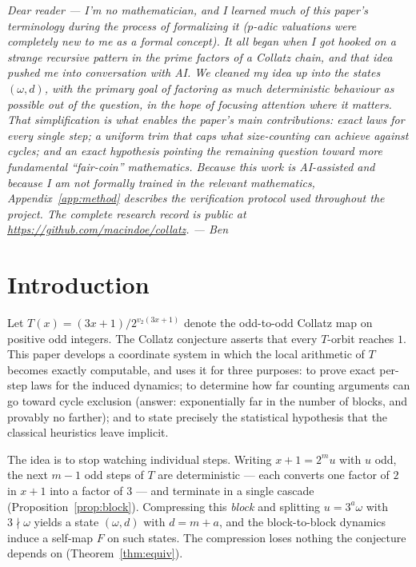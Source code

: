 \documentclass[11pt]{article}
\theoremstyle{remark}
\newcommand{\vt}[1]{v_2\!\left(#1\right)}
\newcommand{\w}{\omega}
\begin{document}
\emph{Dear reader --- I'm no mathematician, and I learned much of this paper's terminology during the process of formalizing it ($p$-adic valuations were completely new to me as a formal concept). It all began when I got hooked on a strange recursive pattern in the prime factors of a Collatz chain, and that idea pushed me into conversation with AI. We cleaned my idea up into the states $(\w,d)$, with the primary goal of factoring as much deterministic behaviour as possible out of the question, in the hope of focusing attention where it matters. That simplification is what enables the paper's main contributions: exact laws for every single step; a uniform trim that caps what size-counting can achieve against cycles; and an exact hypothesis pointing the remaining question toward more fundamental ``fair-coin'' mathematics. Because this work is AI-assisted and because I am not formally trained in the relevant mathematics, Appendix~\ref{app:method} describes the verification protocol used throughout the project. The complete research record is public at \url{https://github.com/macindoe/collatz}. --- Ben}

\section{Introduction}

Let $T(x) = (3x+1)/2^{\vt{3x+1}}$ denote the odd-to-odd Collatz map on positive odd integers. The Collatz conjecture asserts that every $T$-orbit reaches $1$. This paper develops a coordinate system in which the local arithmetic of $T$ becomes exactly computable, and uses it for three purposes: to prove exact per-step laws for the induced dynamics; to determine how far counting arguments can go toward cycle exclusion (answer: exponentially far in the number of blocks, and provably no farther); and to state precisely the statistical hypothesis that the classical heuristics leave implicit.

The idea is to stop watching individual steps. Writing $x + 1 = 2^m u$ with $u$ odd, the next $m-1$ odd steps of $T$ are deterministic --- each converts one factor of $2$ in $x+1$ into a factor of $3$ --- and terminate in a single cascade (Proposition~\ref{prop:block}). Compressing this \emph{block} and splitting $u = 3^a\w$ with $3\nmid\w$ yields a state $(\w, d)$ with $d = m + a$, and the block-to-block dynamics induce a self-map $F$ on such states. The compression loses nothing the conjecture depends on (Theorem~\ref{thm:equiv}).
\end{document}
